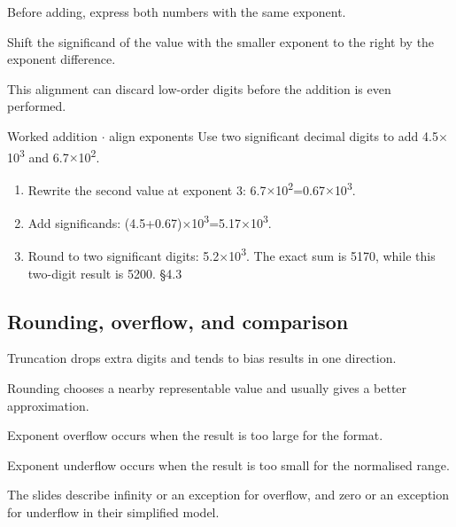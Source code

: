 \documentclass[11pt]{article}
\begin{document}
\begin{keepsection}
\begin{keepsection}
Before adding, express both numbers with the same exponent.

Shift the significand of the value with the smaller exponent to the right by the exponent difference.

This alignment can discard low-order digits before the addition is even performed.

\begin{workedbox}{Worked addition \ensuremath{\cdot} align exponents}
Use two significant decimal digits to add 4.5\ensuremath{\times}10\textsuperscript{3} and 6.7\ensuremath{\times}10\textsuperscript{2}.

\begin{enumerate}
\item Rewrite the second value at exponent 3: 6.7\ensuremath{\times}10\textsuperscript{2}=0.67\ensuremath{\times}10\textsuperscript{3}.
\item Add significands: (4.5+0.67)\ensuremath{\times}10\textsuperscript{3}=5.17\ensuremath{\times}10\textsuperscript{3}.
\item Round to two significant digits: 5.2\ensuremath{\times}10\textsuperscript{3}. The exact sum is 5170, while this two-digit result is 5200. \hfill{\small\color{FAUblue}§4.3}
\end{enumerate}
\end{workedbox}
\end{keepsection}

\begin{keepsection}
\subsection{Rounding, overflow, and comparison}

Truncation drops extra digits and tends to bias results in one direction.

Rounding chooses a nearby representable value and usually gives a better approximation.

Exponent overflow occurs when the result is too large for the format.

Exponent underflow occurs when the result is too small for the normalised range.

The slides describe infinity or an exception for overflow, and zero or an exception for underflow in their simplified model.


\end{keepsection}
\end{keepsection}
\end{document}
